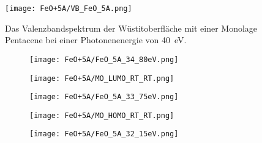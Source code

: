         \begin{figure}
            \centering
            \texttt{[image: FeO+5A/VB\_FeO\_5A.png]}
            \caption{Das Valenzbandspektrum der Wüstitoberfläche mit einer Monolage Pentacene bei einer Photonenenergie von \SI{40}{\electronvolt}.}
            \label{fig:EDC_FeO+5A}
        \end{figure}
        \begin{figure}
            \centering
            \begin{subfigure}[t]{0.48\textwidth}
                \centering
                \texttt{[image: FeO+5A/FeO\_5A\_34\_80eV.png]}
                \label{fig:MOT_FeO+5A_exp_1}
            \end{subfigure}
            \begin{subfigure}[t]{0.48\textwidth}
                \centering
                \texttt{[image: FeO+5A/MO\_LUMO\_RT\_RT.png]}
                \label{fig:MOT_FeO+5A_theo_1}
            \end{subfigure}
            \centering
            \begin{subfigure}[t]{0.48\textwidth}
                \centering
                \texttt{[image: FeO+5A/FeO\_5A\_33\_75eV.png]}
                \label{fig:MOT_FeO+5A_exp_2}
            \end{subfigure}
            \begin{subfigure}[t]{0.48\textwidth}
                \centering
                \texttt{[image: FeO+5A/MO\_HOMO\_RT\_RT.png]}
                \label{fig:MOT_FeO+5A_theo_2}
            \end{subfigure}
            \centering
            \begin{subfigure}[t]{0.48\textwidth}
                \centering
                \texttt{[image: FeO+5A/FeO\_5A\_32\_15eV.png]}

\end{subfigure}
\end{figure}
